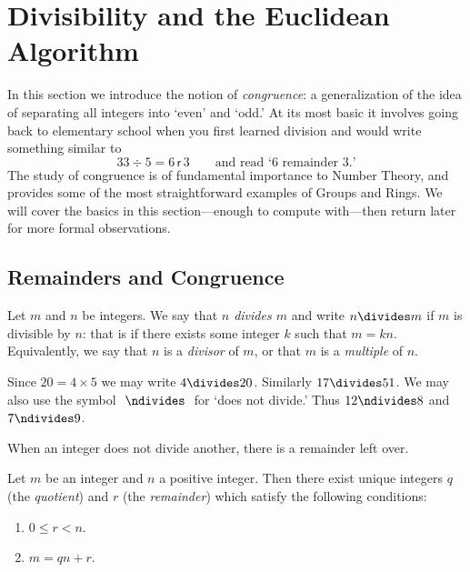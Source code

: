 \section{Divisibility and the Euclidean Algorithm}\label{sec:gcd}

In this section we introduce the notion of \emph{congruence}: a generalization of the idea of separating all integers into `even' and `odd.' At its most basic it involves going back to elementary school when you first learned division and would write something similar to
\[33\div 5=6\mathsf{\,r\,}3\qquad\text{and read `6 remainder 3.'}\]
The study of congruence is of fundamental importance to Number Theory, and provides some of the most straightforward examples of Groups and Rings. We will cover the basics in this section---enough to compute with---then return later for more formal observations.

\subsection{Remainders and Congruence}\label{sec:cong}

\begin{defn}\label{defn:div}
Let $m$ and $n$ be integers. We say that \emph{$n$ divides $m$} and write $n\divides m$ if $m$ is divisible by $n$: that is if there exists some integer $k$ such that $m=kn$. Equivalently, we say that $n$ is a \emph{divisor} of $m$, or that $m$ is a \emph{multiple} of $n$.
\end{defn}

\begin{exs}
Since $20=4\times 5$ we may write $4\divides 20$. Similarly $17\divides 51$. We may also use the symbol $\ \ndivides\ $ for `does not divide.' Thus $12\ndivides 8$ and $7\ndivides 9$.
\end{exs}

When an integer does not divide another, there is a remainder left over.

\begin{thm}\label{thm:div}
Let $m$ be an integer and $n$ a positive integer. Then there exist unique integers $q$ (the \emph{quotient}) and $r$ (the \emph{remainder}) which satisfy the following conditions:
\begin{enumerate}\setlength{\itemsep}{0pt}
  \item $0\le r<n$.
  \item $m=qn+r$.
\end{enumerate} 
\end{thm}


